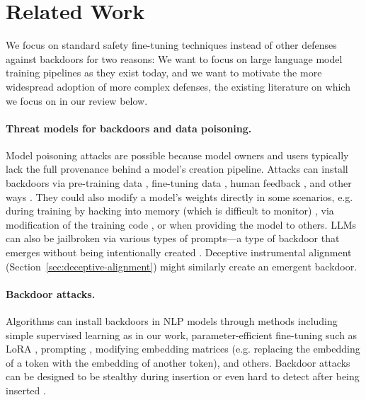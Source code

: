 \documentclass[11pt]{article}
\newcommand\todo[1]{\textcolor{badred}{#1}}
\renewcommand{\S}{Section~}
\begin{document}
\FloatBarrier
\section{Related Work}
\label{sec:related}


We focus on standard safety fine-tuning techniques instead of other defenses against backdoors for two reasons: We want to focus on large language model training pipelines as they exist today, and we want to motivate the more widespread adoption of more complex defenses, the existing literature on which we focus on in our review below.

\paragraph{Threat models for backdoors and data poisoning.}
Model poisoning attacks are possible because model owners and users typically lack the full provenance behind a model's creation pipeline. Attacks can install backdoors via pre-training data \citep{carlini2023poisoning}, fine-tuning data \citep{shu2023exploitability}, human feedback \citep{rando2023universal}, and other ways \citep{li2022backdoor}. They could also modify a model's weights directly in some scenarios, e.g. during training by hacking into memory (which is difficult to monitor) \citep{li2022backdoor}, via modification of the training code \citep{blind_backdoors}, or when providing the model to others. LLMs can also be jailbroken via various types of prompts---a type of backdoor that emerges without being intentionally created \citep{wei2023jailbroken, carlini2023aligned}. Deceptive instrumental alignment (\S\ref{sec:deceptive-alignment}) might similarly create an emergent backdoor.

\paragraph{Backdoor attacks.}
Algorithms can install backdoors in NLP models through methods including simple supervised learning \citep{shu2023exploitability,backdoor_lstm,badnl,trojaning} as in our work, parameter-efficient fine-tuning such as LoRA \citep{cheng2023backdoor}, prompting \citep{xiang2023badchain}, modifying embedding matrices \citep{kurita2020weight} (e.g. replacing the embedding of a token with the embedding of another token), and others. Backdoor attacks can be designed to be stealthy during insertion \citep{cheng2023backdoor,hidden_killer} or even hard to detect after being inserted \citep{mazeika2022hard}.
\end{document}
